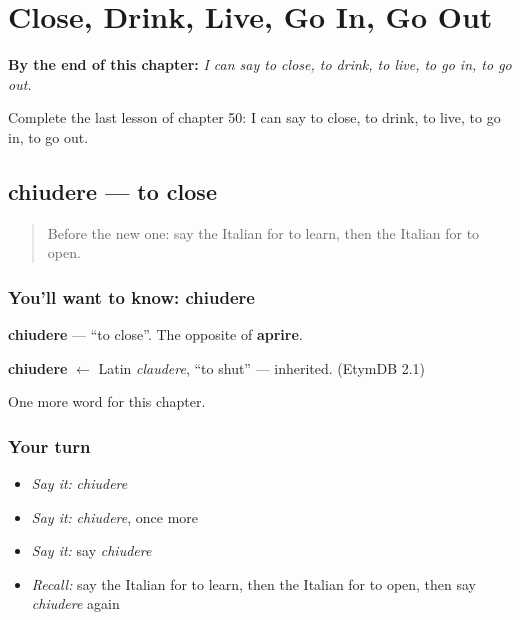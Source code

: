 
\chapter{Close, Drink, Live, Go In, Go Out}
\label{ch:it-close-drink-live-go-in-go-out}

\begin{chapteropening}
\textbf{By the end of this chapter:} \emph{I can say to close, to drink, to live, to go in, to go out.}

Complete the last lesson of chapter 50: I can say to close, to drink, to live, to go in, to go out.
\end{chapteropening}

\section[chiudere]{chiudere — to close}

\label{lesson:IT-C50-chiudere}



\begin{quote}
Before the new one: say the Italian for to learn, then the Italian for to open.
\end{quote}

\subsection*{You'll want to know: chiudere}
\textbf{chiudere} — \textquotedblleft{}to close\textquotedblright{}. The opposite of \textbf{aprire}.

\begin{cousinweb}
\textbf{chiudere} $\leftarrow$ Latin \emph{claudere}, \textquotedblleft{}to shut\textquotedblright{} — inherited. (EtymDB 2.1)
\end{cousinweb}

\begin{grammarlens}[title={What you've built}]
One more word for this chapter.
\end{grammarlens}

\subsection*{Your turn}
\begin{itemize}
\raggedright
  \item \emph{Say it:} \emph{chiudere}
  \item \emph{Say it:} \emph{chiudere}, once more
  \item \emph{Say it:} say \emph{chiudere}
  \item \emph{Recall:} say the Italian for to learn, then the Italian for to open, then say \emph{chiudere} again
\end{itemize}

